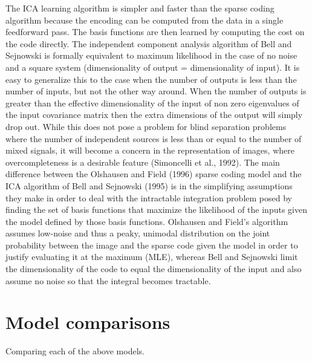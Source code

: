 The ICA learning algorithm is simpler and faster than the sparse coding algorithm because the encoding can be computed from the data in a single feedforward pass. The basis functions are then learned by computing the cost on the code directly. The independent component analysis algorithm of Bell and Sejnowski is formally equivalent to maximum likelihood in the case of no noise and a square system (dimensionality of output = dimensionality of input). It is easy to generalize this to the case when the number of outputs is less than the number of inputs, but not the other way around. When the number of outputs is greater than the effective dimensionality of the input of non zero eigenvalues of the input covariance matrix then the extra dimensions of the output will simply drop out. While this does not pose a problem for blind separation problems where the number of independent sources is less than or equal to the number of mixed signals, it will become a concern in the representation of images, where overcompleteness is a desirable feature (Simoncelli et al., 1992). The main difference between the Olshausen and Field (1996) sparse coding model and the ICA algorithm of Bell and Sejnowski (1995) is in the simplifying assumptions they make in order to deal with the intractable integration problem posed by finding the set of basis functions that maximize the likelihood of the inputs given the model defined by those basis functions. Olshausen and Field’s algorithm assumes low-noise and thus a peaky, unimodal distribution on the joint probability between the image and the sparse code given the model in order to justify evaluating it at the maximum (MLE), whereas Bell and Sejnowski limit the dimensionality of the code to equal the dimensionality of the input and also assume no noise so that the integral becomes tractable.

\section{Model comparisons}
Comparing each of the above models.